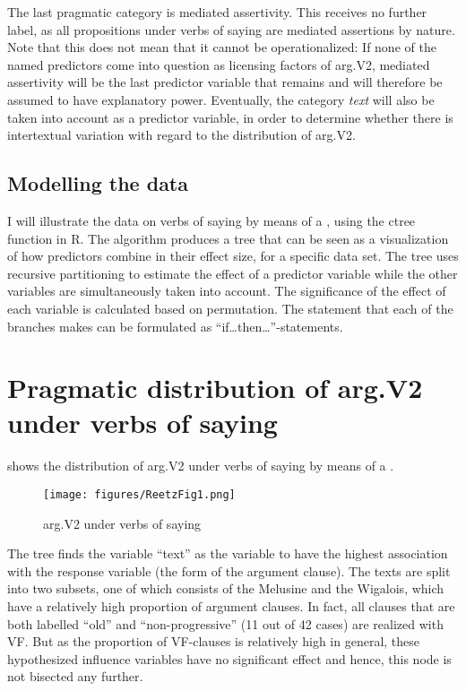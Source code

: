 \documentclass[output=paper,colorlinks,citecolor=brown]{langscibook}
\begin{document}
The last pragmatic category is mediated assertivity. This receives no further label, as all propositions under verbs of saying are mediated assertions by nature. Note that this does not mean that it cannot be operationalized: If none of the named predictors come into question as licensing factors of arg.V2, mediated assertivity will be the last predictor variable that remains and will therefore be assumed to have explanatory power. Eventually, the category \textit{text} will also be taken into account as a predictor variable, in order to determine whether there is intertextual variation with regard to the distribution of arg.V2.

\subsection{Modelling the data}\label{sec:reetz:4.4}
I will illustrate the data on verbs of saying by means of a , using the ctree function in R. The  algorithm produces a tree that can be seen as a visualization of how predictors combine in their effect size, for a specific data set.  
The tree uses recursive partitioning to estimate the effect of a predictor variable while the other variables are simultaneously taken into account. The significance of the effect of each variable is calculated based on permutation. The statement that each of the branches makes can be formulated as “if…then…”-statements.

\section{Pragmatic distribution of arg.V2 under verbs of saying}\label{sec:reetz:5}

 shows the distribution of arg.V2 under verbs of saying by means of a .

\begin{sidewaysfigure}
    \centering
    \texttt{[image: figures/ReetzFig1.png]}
    \caption{arg.V2 under verbs of saying}
    \label{fsaying}
\end{sidewaysfigure}

The tree finds the variable “text” as the variable to have the highest association with the response variable (the form of the argument clause). The texts are split into two subsets, one of which consists of the Melusine and the Wigalois, which have a relatively high proportion of  argument clauses. In fact, all clauses that are both labelled ``old'' and ``non-progressive'' (11 out of 42 cases) are realized with VF. But as the proportion of VF-clauses is relatively high in general, these hypothesized influence variables have no significant effect and hence, this node is not bisected any further.
\end{document}
